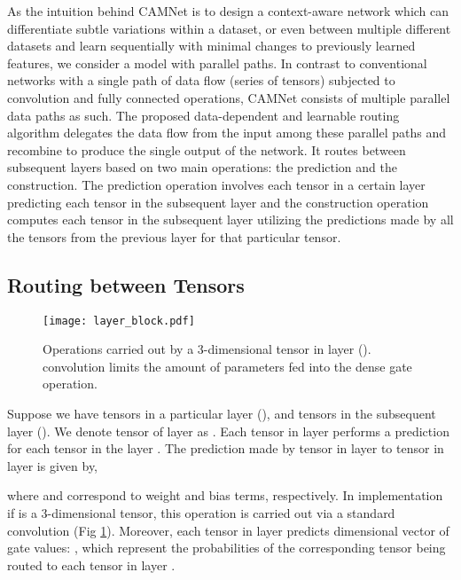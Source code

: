 \documentclass[10pt,twocolumn,letterpaper]{article}
\begin{document}
As the intuition behind CAMNet is to design a context-aware network which can differentiate subtle variations within a dataset, or even between multiple different datasets and learn sequentially with minimal changes to previously learned features, we consider a model with parallel paths. In contrast to conventional networks with a single path of data flow (series of tensors) subjected to convolution and fully connected operations, CAMNet consists of multiple parallel data paths as such. The proposed data-dependent and learnable routing algorithm delegates the data flow from the input among these parallel paths and recombine to produce the single output of the network. It routes between subsequent layers based on two main operations: the prediction and the construction. The prediction operation involves each tensor in a certain layer predicting each tensor in the subsequent layer and the construction operation computes each tensor in the subsequent layer utilizing the predictions made by all the tensors from the previous layer for that particular tensor.


\subsection{Routing between Tensors}
\label{ss:_sa_routing}
\vspace{-0.05in}

\begin{figure}[t]
	\begin{center}
		\texttt{[image: layer\_block.pdf]}
	\end{center}
	\vspace{-0.2in}
	\caption{Operations carried out by a 3-dimensional tensor  in layer  ().  convolution limits the amount of parameters fed into the dense gate operation.}
	\label{fig:block}
	\vspace{-0.1in}
\end{figure}

Suppose we have  tensors in a particular layer (), and  tensors in the subsequent layer (). We denote tensor  of layer  as . 
Each tensor in layer  performs a prediction for each tensor in the layer . The prediction  made by tensor  in layer  to tensor  in layer  is given by, 
\vspace{-0.1in}
 

where  and  correspond to weight and bias terms, respectively. In implementation if  is a 3-dimensional tensor, this operation is carried out via a standard convolution (Fig \ref{fig:block}). Moreover, each tensor in layer   predicts  dimensional vector of gate values: , which represent the probabilities of the corresponding tensor  being routed to each tensor in layer . \vspace{-0.1in}
 
\end{document}
